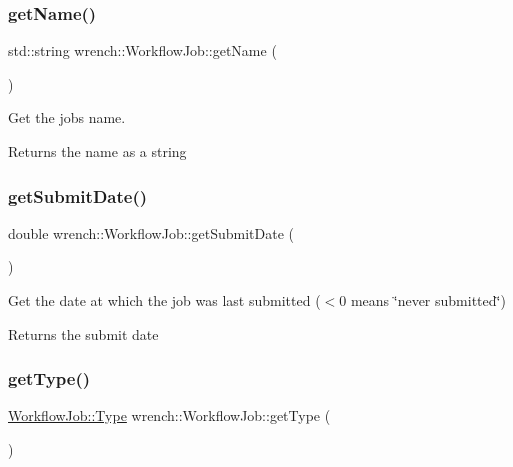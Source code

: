 \subsubsection{\texorpdfstring{get\+Name()}{getName()}}
{\footnotesize\ttfamily std\+::string wrench\+::\+Workflow\+Job\+::get\+Name (\begin{DoxyParamCaption}{ }\end{DoxyParamCaption})}



Get the job\textquotesingle{}s name. 

\begin{DoxyReturn}{Returns}
the name as a string 
\end{DoxyReturn}
\mbox{\label{classwrench_1_1_workflow_job_a05f015d4d97263662bf2d6d617611a34}} 
\subsubsection{\texorpdfstring{get\+Submit\+Date()}{getSubmitDate()}}
{\footnotesize\ttfamily double wrench\+::\+Workflow\+Job\+::get\+Submit\+Date (\begin{DoxyParamCaption}{ }\end{DoxyParamCaption})}



Get the date at which the job was last submitted ($<$0 means \char`\"{}never submitted\char`\"{}) 

\begin{DoxyReturn}{Returns}
the submit date 
\end{DoxyReturn}
\mbox{\label{classwrench_1_1_workflow_job_a1883671a4e72877bb7fcb0ce771fdc7e}} 
\subsubsection{\texorpdfstring{get\+Type()}{getType()}}
{\footnotesize\ttfamily \hyperlink{classwrench_1_1_workflow_job_a5dcf81c50b5d221ef2a48126bf45d08b}{Workflow\+Job\+::\+Type} wrench\+::\+Workflow\+Job\+::get\+Type (\begin{DoxyParamCaption}{ }\end{DoxyParamCaption})}



